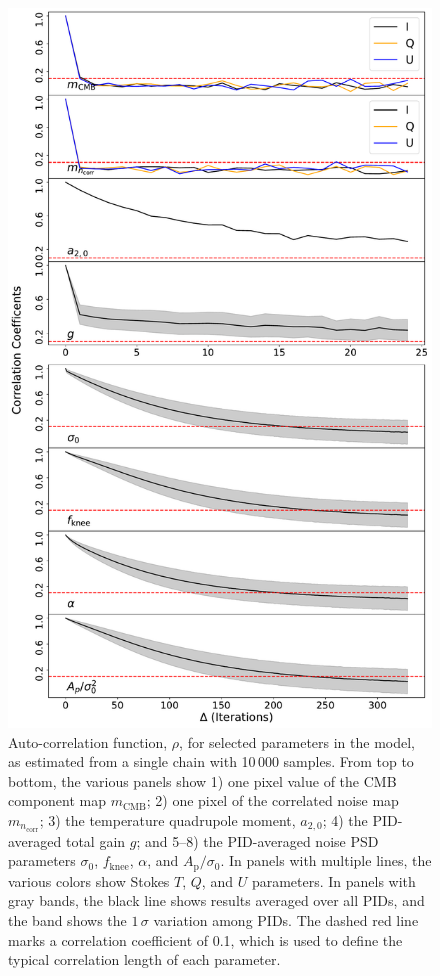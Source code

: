 \documentclass[twocolumn]{aa}%
\begin{document}
\begin{figure}[t]
  \center
  \includegraphics[width = \linewidth]{figs/spectral_27M_correlation_len_burn_in.pdf}
  \caption{Auto-correlation function, $\rho$, for selected parameters
    in the model, as estimated from a single chain with 10\,000
    samples. From top to bottom, the various panels show 1) one pixel
    value of the CMB component map $m_\mathrm{CMB}$; 2) one pixel of
    the correlated noise map $m_{n_\mathrm{corr}}$; 3) the temperature
    quadrupole moment, $a_{2,0}$; 4) the PID-averaged total gain $g$;
    and 5--8) the PID-averaged noise PSD parameters $\sigma_0$,
    $f_{\mathrm{knee}}$, $\alpha$, and $A_{\mathrm{p}}/\sigma_0$. In
    panels with multiple lines, the various colors show Stokes $T$,
    $Q$, and $U$ parameters. In panels with gray bands, the black line
    shows results averaged over all PIDs, and the band shows the
    $1\,\sigma$ variation among PIDs. The dashed red line marks a
    correlation coefficient of 0.1, which is used to define the
    typical correlation length of each parameter.
  }
  \label{fig:spectral_burnin_corrlen}
\end{figure}
\end{document}

